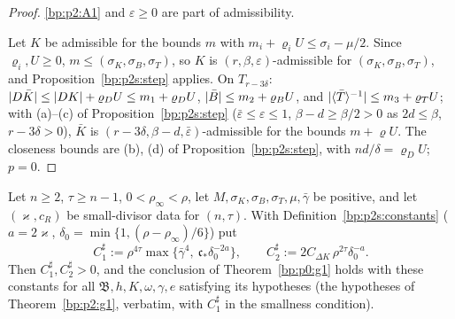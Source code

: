 \begin{proof}
\label{step:p2s:fs-n1}
\ref{bp:p2:A1} and $\varepsilon\ge0$ are part of admissibility.

\label{step:p2s:fs-n2}
Let $K$ be admissible for the bounds $m$ with $m_i+\varrho_iU\le\sigma_i-\mu/2$. Since $\varrho_i,U\ge0$, $m\le(\sigma_K,\sigma_B,\sigma_T)$, so
$K$ is $(r,\beta,\varepsilon)$-admissible for $(\sigma_K,\sigma_B,\sigma_T)$, and Proposition~\ref{bp:p2s:step} applies. On
$T_{r-3\delta}$: $\lvert D\bar K\rvert\le\lvert DK\rvert+\varrho_DU\le m_1+\varrho_DU$, $\lvert \bar B\rvert\le m_2+\varrho_BU$, and
$\lvert \langle \bar T\rangle^{-1}\rvert\le m_3+\varrho_TU$; with (a)--(c) of Proposition~\ref{bp:p2s:step} ($\bar\varepsilon\le\varepsilon\le1$,
$\beta-d\ge\beta/2>0$ as $2d\le\beta$, $r-3\delta>0$), $\bar K$ is $(r-3\delta,\beta-d,\bar\varepsilon)$-admissible for the bounds $m+\varrho U$. The closeness
bounds are (b), (d) of Proposition~\ref{bp:p2s:step}, with $nd/\delta=\varrho_DU$; $p=0$.
\end{proof}

\begin{theorem}\label{bp:p2s:g1}
Let $n\ge2$, $\tau\ge n-1$, $0<\rho_\infty<\rho$, let $M,\sigma_K,\sigma_B,\sigma_T,\mu,\bar\gamma$ be positive, and let $(\varkappa,c_R)$ be
small-divisor data for $(n,\tau)$. With Definition~\ref{bp:p2s:constants} ($a=2\varkappa$, $\delta_0=\min\{1,(\rho-\rho_\infty)/6\}$) put
\[
C_1^\sharp:=\rho^{4\tau}\max\bigl\{\bar\gamma^4,\ \mathfrak c_*\delta_0^{-2a}\bigr\},\qquad C_2^\sharp:=2C_{\Delta K}\,\rho^{2\tau}\delta_0^{-a}.
\]
Then $C_1^\sharp,C_2^\sharp>0$, and the conclusion of Theorem~\ref{bp:p0:g1} holds with these constants for all $\mathfrak B,h,K,\omega,\gamma,e$
satisfying its hypotheses (the hypotheses of Theorem~\ref{bp:p2:g1}, verbatim, with $C_1^\sharp$ in the smallness condition).
\end{theorem}

